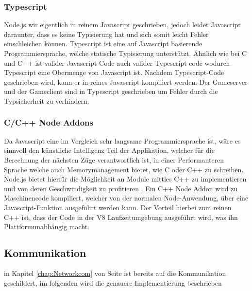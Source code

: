\documentclass[12pt,a4paper,bibliography=totocnumbered,listof=totocnumbered]{article}
\begin{document}
\subsubsection{Typescript}
Node.js wir eigentlich in reinem Javascript geschrieben, jedoch leidet Javascript daraunter, dass es keine Typisierung hat und sich somit leicht Fehler 
einschleichen können. Typescript ist eine auf Javascript basierende Programmiersprache, welche statische Typisierung unterstützt. 
Ähnlich wie bei C und C++ ist valider Javascript-Code auch valider Typescript code wodurch Typescript eine Obermenge von Javascript ist.
Nachdem Typescript-Code geschrieben wird, kann er in reines Javascript kompiliert werden. 
Der Gameserver und der Gameclient sind in Typescript geschrieben um Fehler durch die Typsicherheit zu verhindern. 

\subsubsection{C/C++ Node Addons}
Da Javascript eine im Vergleich sehr langsame Programmiersprache ist, wäre es sinnvoll den künstliche Intelligenz Teil der Applikation, welcher für die 
Berechnung der nächsten Züge verantwortlich ist, in einer Performanteren Sprache welche auch Memorymanagement bietet, wie C oder C++ zu schreiben. 
Node.js bietet hierfür die Möglichkeit an
Module mittles C++ zu implementieren und von deren Geschwindigkeit zu profitieren \cite{NodeC++Performance}. Ein C++ Node Addon wird zu Maschinencode kompiliert, welcher von der
normalen Node-Anwendung, über eine Javascript-Funktion ausgeführt werden kann. Der Vorteil hierbei zum reinen C++ ist, dass der Code in der V8 
Laufzeitumgebung ausgeführt wird, was ihn Plattformunabhängig macht. \cite{C++Node}


\subsection{Kommunikation}
in Kapitel \ref{chap:Networkcom} von Seite \pageref{chap:Networkcom} ist bereits auf die Kommunikation geschildert, im folgenden wird die genauere Implementierung beschrieben
\end{document}
